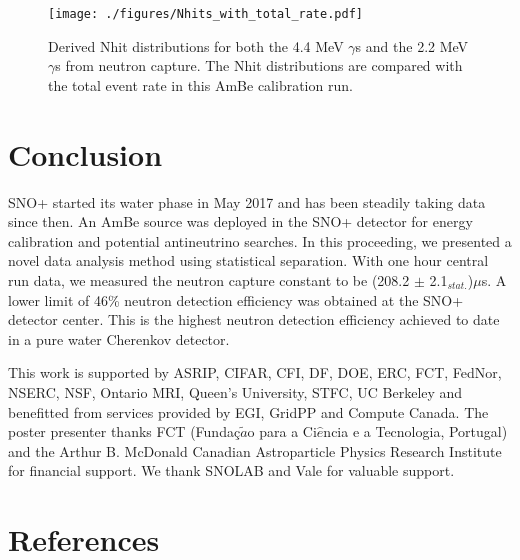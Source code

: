\documentclass[a4paper]{jpconf}
\begin{document}
\begin{figure}[h]
\begin{center}
\texttt{[image: ./figures/Nhits\_with\_total\_rate.pdf]}
\end{center}
\caption{\label{fig:4}Derived Nhit distributions for both the 4.4 MeV $\gamma$s and the 2.2 MeV $\gamma$s from neutron capture. The Nhit distributions are compared with the total event rate in this AmBe calibration run.}
\end{figure}

\section{Conclusion}

SNO+ started its water phase in May 2017 and has been steadily taking data since then. An AmBe source was deployed in the SNO+ detector for energy calibration and potential antineutrino searches. In this proceeding, we presented a novel data analysis method using statistical separation. With one hour central run data, we measured the neutron capture constant to be (208.2 $\pm$ 2.1$_{\textit{stat.}}$)$\mu$s. A lower limit of 46\% neutron detection efficiency was obtained at the SNO+ detector center. This is the highest neutron detection efficiency achieved to date in a pure water Cherenkov detector. 


\ack{}

This work is supported by ASRIP, CIFAR, CFI, DF, DOE, ERC, FCT, FedNor, NSERC, NSF, Ontario MRI, Queen's University, STFC, UC Berkeley and benefitted from services provided by EGI, GridPP and Compute Canada. The poster presenter thanks FCT (Funda\c{c}$\tilde{a}$o para a Ci$\hat{e}$ncia e a Tecnologia, Portugal) and the Arthur B. McDonald Canadian Astroparticle Physics Research Institute for financial support. We thank SNOLAB and Vale for valuable support.

\section*{References}


\end{document}
